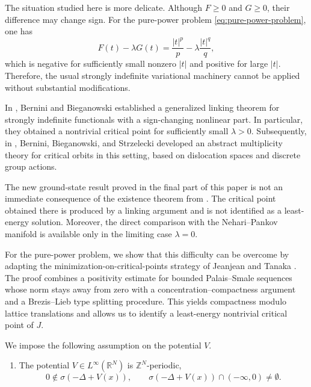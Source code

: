 \documentclass[10pt,a4paper]{amsart}
\numberwithin{equation}{section}
\newcommand{\R}{\mathbb{R}}
\newcommand{\Z}{\mathbb{Z}}
\begin{document}
The situation studied here is more delicate. Although $F\geq 0$ and
$G\geq 0$, their difference may change sign. For the pure-power problem
\eqref{eq:pure-power-problem}, one has
\[
F(t)-\lambda G(t)
=
\frac{|t|^p}{p}
-
\lambda\frac{|t|^q}{q},
\]
which is negative for sufficiently small nonzero $|t|$ and positive for
large $|t|$. Therefore, the usual strongly indefinite variational
machinery cannot be applied without substantial modifications.

In \cite{BB2022}, Bernini and Bieganowski established a generalized
linking theorem for strongly indefinite functionals with a sign-changing
nonlinear part. In particular, they obtained a nontrivial critical point
for sufficiently small $\lambda>0$. Subsequently, in \cite{BBS2025},
Bernini, Bieganowski, and Strzelecki developed an abstract multiplicity
theory for critical orbits in this setting, based on dislocation spaces and
discrete group actions.

The new ground-state result proved in the final part of this paper is not
an immediate consequence of the existence theorem from \cite{BB2022}. The
critical point obtained there is produced by a linking argument and is not
identified as a least-energy solution. Moreover, the direct comparison with
the Nehari--Pankov manifold is available only in the limiting case
$\lambda=0$.

For the pure-power problem, we show that this difficulty can be overcome by adapting the minimization-on-critical-points strategy of Jeanjean and Tanaka \cite{JeanjeanTanaka}.
The proof combines a positivity estimate for bounded Palais--Smale
sequences whose norm stays away from zero with a
concentration--compactness argument and a Brezis--Lieb type splitting
procedure. This yields compactness modulo lattice translations and allows
us to identify a least-energy nontrivial critical point of $J$.



We impose the following assumption on the potential $V$.

\begin{enumerate} [label=(V),ref=V]
\item \label{ass:V}
The potential $V\in L^\infty(\R^N)$ is  $\Z^{N}$-periodic,
\[
0\notin\sigma\left(-\Delta+V(x)\right),
\qquad
\sigma\left(-\Delta+V(x)\right)\cap(-\infty,0)\ne\emptyset.
\]
\end{enumerate}
\end{document}
